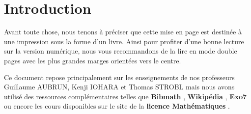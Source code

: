 \part{Introduction}

\def\arraystretch{1.5}
\par Avant toute chose, nous tenons à préciser que cette mise en page est destinée à une impression sous la forme d'un livre. Ainsi pour profiter d'une bonne lecture sur la version numérique, nous vous recommandons de la lire en mode \og double pages \fg avec les plus grandes marges orientées vers le centre. 
\\
\par \noindent Ce document repose principalement sur les enseignements de nos professeurs Guillaume AUBRUN, Kenji IOHARA et Thomas STROBL
mais nous avons utilisé des ressources complémentaires telles que \textbf{Bibmath} \cite{bibmath}, \textbf{Wikipédia} \cite{wikipedia}, \textbf{Exo7} \cite{exo7} ou encore les cours disponibles sur le site de la \textbf{licence Mathématiques} \cite{licence_maths}.

